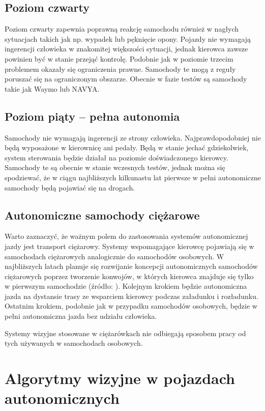 \subsection{Poziom czwarty}

Poziom czwarty zapewnia poprawną reakcję samochodu również w nagłych sytuacjach takich jak np. wypadek lub pęknięcie opony. 
Pojazdy nie wymagają ingerencji człowieka w znakomitej większości sytuacji, jednak kierowca zawsze powinien być w stanie przejąć kontrolę. 
Podobnie jak w poziomie trzecim problemem okazały się ograniczenia prawne. 
Samochody te mogą z reguły poruszać się na ograniczonym obszarze. 
Obecnie w fazie testów są samochody takie jak Waymo lub NAVYA.

\subsection{Poziom piąty -- pełna autonomia}

Samochody nie wymagają ingerencji ze strony człowieka. 
Najprawdopodobniej nie będą wyposażone w kierownicę ani pedały. 
Będą w stanie jechać gdziekolwiek, system sterowania będzie działał na poziomie doświadczonego kierowcy. 
Samochody te są obecnie w stanie wczesnych testów, jednak można się spodziewać, że w ciągu najbliższych kilkunastu lat pierwsze w pełni autonomiczne samochody będą pojawiać się na drogach.


\subsection{Autonomiczne samochody ciężarowe}

Warto zaznaczyć, że ważnym polem do zastosowania systemów autonomicznej jazdy jest transport ciężarowy. 
Systemy wspomagające kierowcę pojawiają się w samochodach ciężarowych analogicznie do samochodów osobowych. 
W najbliższych latach planuje się rozwijanie koncepcji autonomicznych samochodów ciężarowych poprzez tworzenie konwojów, w których kierowca znajduje się tylko w pierwszym samochodzie (źródło: \cite{W4}).
Kolejnym krokiem będzie autonomiczna jazda na dystansie trasy ze wsparciem kierowcy podczas załadunku i rozładunku. 
Ostatnim krokiem, podobnie jak w przypadku samochodów osobowych, będzie w pełni autonomiczna jazda bez udziału człowieka.

Systemy wizyjne stosowane w ciężarówkach nie odbiegają sposobem pracy od tych używanych w samochodach osobowych.



\section{Algorytmy wizyjne w pojazdach autonomicznych}


